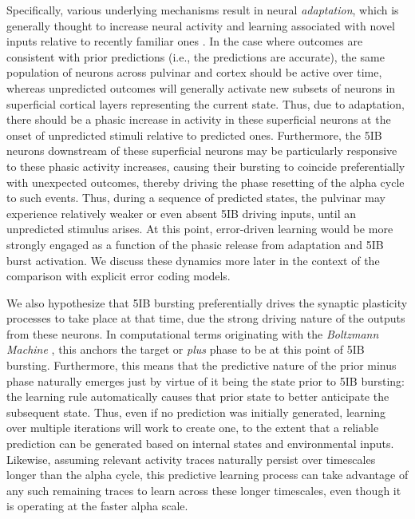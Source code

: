 \documentclass[11pt,twoside]{article}
\newif\myifpdf
\begin{document}
Specifically, various underlying mechanisms result in neural \emph{adaptation}, which is generally thought to increase neural activity and learning associated with novel inputs relative to recently familiar ones \citep{MullerMethaKrauskopfEtAl99,AbbottVarelaSenEtAl97,BretteGerstner05,Grill-SpectorHensonMartin06,Hennig13}.  In the case where outcomes are consistent with prior predictions (i.e., the predictions are accurate), the same population of neurons across pulvinar and cortex should be active over time, whereas unpredicted outcomes will generally activate new subsets of neurons in superficial cortical layers representing the current state.  Thus, due to adaptation, there should be a phasic increase in activity in these superficial neurons at the onset of unpredicted stimuli relative to predicted ones.  Furthermore, the 5IB neurons downstream of these superficial neurons may be particularly responsive to these phasic activity increases, causing their bursting to coincide preferentially with unexpected outcomes, thereby driving the phase resetting of the alpha cycle to such events. Thus, during a sequence of predicted states, the pulvinar may experience relatively weaker or even absent 5IB driving inputs, until an unpredicted stimulus arises.  At this point, error-driven learning would be more strongly engaged as a function of the phasic release from adaptation and 5IB burst activation.  We discuss these dynamics more later in the context of the comparison with explicit error coding models.

We also hypothesize that 5IB bursting preferentially drives the synaptic plasticity processes to take place at that time, due the strong driving nature of the outputs from these neurons.  In computational terms originating with the \emph{Boltzmann Machine} \citep{AckleyHintonSejnowski85,HintonSalakhutdinov06}, this anchors the target or \emph{plus} phase to be at this point of 5IB bursting.  Furthermore, this means that the predictive nature of the prior minus phase naturally emerges just by virtue of it being the state prior to 5IB bursting: the learning rule automatically causes that prior state to better anticipate the subsequent state.  Thus, even if no prediction was initially generated, learning over multiple iterations will work to create one, to the extent that a reliable prediction can be generated based on internal states and environmental inputs.  Likewise, assuming relevant activity traces naturally persist over timescales longer than the alpha cycle, this predictive learning process can take advantage of any such remaining traces to learn across these longer timescales, even though it is operating at the faster alpha scale.
\end{document}
